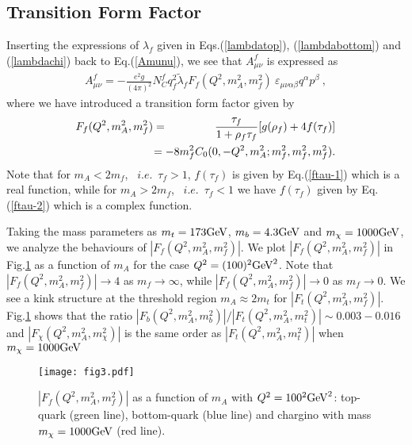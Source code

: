 \documentclass[final,5p,times,twocolumn]{elsarticle}
\newcommand{\bea}{\begin{eqnarray}}
\newcommand{\eea}{\end{eqnarray}}
\newcommand{\nn}{\nonumber}
\begin{document}
\subsection{Transition Form Factor}
Inserting the expressions of $\lambda_f$ given in Eqs.(\ref{lambdatop}), (\ref{lambdabottom}) and  
(\ref{lambdachi}) back to Eq.(\ref{Amunu}), we 
see that $A^f_{\mu\nu}$ is expressed as
\bea
A^f_{\mu\nu}=-\frac{e^2g}{(4\pi)^2} N^f_C q_f^2 {\widetilde \lambda}_fF_f(Q^2,m_A^2, m_f^2)\ \varepsilon_{\mu\nu\alpha\beta}q^\alpha p^\beta~,
\eea
where we have introduced a transition form factor given by
\bea
F_f(Q^2,m_A^2, m_f^2)&=&\frac{\tau_f}{1+\rho_f\tau_f}[g(\rho_f)+4f(\tau_f)]\nn\\
&&\hspace{-0.7cm}=-8m_f^2C_0(0, -Q^2,m_A^2; m_f^2,m_f^2,m_f^2).\label{FormFactor}
\eea
Note that
for $m_A<2m_f$, \ $i.e.$\  $\tau_f>1$,  $f(\tau_f)$ is given by Eq.(\ref{ftau-1})
which is a real function, while for $m_A>2m_f$, \ $i.e.$\ $\tau_f<1$ we have $f(\tau_f)$ given by Eq.(\ref{ftau-2}) which is a complex function.



Taking the mass parameters as $m_t=173 {\rm GeV}$, $m_b=4.3 {\rm GeV}$ and 
 $m_{\chi}= 1000 {\rm GeV}$, we analyze     
the behaviours of $|F_f(Q^2, m_A^2, m_f^2)|$.  We plot $|F_f(Q^2, m_A^2, m_f^2)|$ in Fig.\ref{mAQ100} as a function of $m_A$ for the case $Q^2=(100)^2 {\rm GeV}^2$. 
Note that $|F_f(Q^2, m_A^2, m_f^2)| \rightarrow 4$ as $m_f \rightarrow \infty$, while 
$|F_f(Q^2, m_A^2, m_f^2)| \rightarrow 0$ as $m_f \rightarrow 0$. 
We see a kink structure at the threshold region $m_A\approx 2m_t$ for $|F_t(Q^2, m_A^2, m_f^2)|$. 
Fig.\ref{mAQ100} shows that the ratio $|F_b(Q^2, m_A^2, m_b^2)|/|F_t(Q^2, m_A^2, m_t^2)|\sim 0.003-0.016$ and $|F_\chi(Q^2, m_A^2, m_\chi^2)|$ is the same order as 
$|F_t(Q^2, m_A^2, m_t^2)|$ when $m_\chi = 1000 {\rm GeV}$

\begin{figure}[hbt]
\begin{center}
\texttt{[image: fig3.pdf]}
\caption{$|F_f(Q^2, m_A^2, m_f^2)|$ as a function of $m_A$ with $Q^2=100^2 {\rm GeV}^2$: 
top-quark (green line),  bottom-quark (blue line) and  chargino with mass $m_\chi=1000{\rm GeV}$ (red line)\label{mAQ100}. }
\end{center}
\end{figure}
\end{document}
